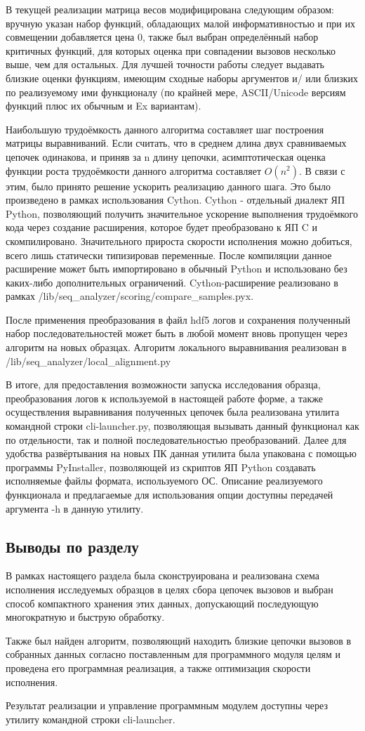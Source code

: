 В текущей реализации матрица весов модифицирована следующим образом: вручную указан набор функций, обладающих малой информативностью и при их совмещении добавляется цена 0, также был выбран определённый набор критичных функций, для которых оценка при совпадении вызовов несколько выше, чем для остальных. Для лучшей точности работы следует выдавать близкие оценки функциям, имеющим сходные наборы аргументов и/ или близких по реализуемому ими функционалу (по крайней мере, ASCII/Unicode версиям функций плюс их обычным и Ex вариантам).

Наибольшую трудоёмкость данного алгоритма составляет шаг построения матрицы выравниваний. Если считать, что в среднем длина двух сравниваемых цепочек одинакова, и приняв за n длину цепочки, асимптотическая оценка функции роста трудоёмкости данного алгоритма составляет $O(n^2)$. В связи с этим, было принято решение ускорить реализацию данного шага. Это было произведено в рамках использования Cython. Cython - отдельный диалект ЯП Python, позволяющий получить значительное ускорение выполнения трудоёмкого кода через создание расширения, которое будет преобразовано к ЯП C и скомпилировано.  Значительного прироста скорости исполнения можно добиться, всего лишь статически типизировав переменные. После компиляции данное расширение может быть импортировано в обычный Python и использовано без каких-либо дополнительных ограничений. Cython-расширение реализовано в рамках /lib/seq\_analyzer/scoring/compare\_samples.pyx.

После применения преобразования в файл hdf5 логов и сохранения полученный набор последовательностей может  быть в любой момент вновь пропущен через алгоритм на новых образцах. 
Алгоритм локального выравнивания реализован в /lib/seq\_analyzer/local\_alignment.py

В итоге, для предоставления возможности запуска исследования образца, преобразования логов к используемой в настоящей работе форме, а также осуществления выравнивания полученных цепочек была реализована утилита командной строки cli-launcher.py, позволяющая вызывать данный функционал как по отдельности, так и полной последовательностью преобразований. Далее для удобства развёртывания на новых ПК данная утилита была упакована с помощью программы PyInstaller, позволяющей из скриптов ЯП Python создавать исполняемые файлы формата, используемого ОС. Описание реализуемого функционала и предлагаемые для использования опции доступны передачей аргумента -h в данную утилиту.
\subsection {Выводы по разделу}
В рамках настоящего раздела была сконструирована и реализована схема исполнения исследуемых образцов в целях сбора цепочек вызовов и выбран способ компактного хранения этих данных, допускающий последующую многократную и быструю обработку.

Также был найден алгоритм, позволяющий находить близкие цепочки вызовов в собранных данных согласно поставленным для программного модуля целям и проведена его программная реализация, а также оптимизация скорости исполнения.

Результат реализации и управление программным модулем доступны через утилиту командной строки cli-launcher.